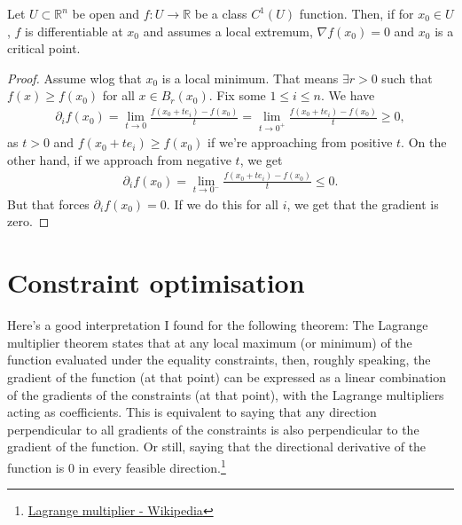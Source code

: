\begin{prop}\label{prop:grad-vanish}
	Let $U \subset \mathbb{R}^{n}$ be open and $f: U \to \mathbb{R}$ be a class $C^{1}(U)$ function. Then, if for $x_{0} \in U$, $f$ is differentiable at $x_{0}$ and assumes a local extremum, $\nabla f(x_{0}) = 0$ and $x_{0}$ is a critical point.
\end{prop}
\begin{proof}
	Assume wlog that $x_{0}$ is a local minimum. That means $\exists r > 0$ such that $f(x) \geq f (x_{0})$ for all $x \in B_{r}(x_{0})$. Fix some $1 \leq i \leq n$. We have
	\begin{align*}
		\partial_{i}f(x_{0}) = \lim_{t \to 0} \frac{f(x_{0} + te_{i}) -f(x_{0})}{t} = \lim_{t \to 0^{+}} \frac{f(x_{0} + te_{i}) -f(x_{0})}{t} \geq 0,
	\end{align*}
	as $t > 0$ and $f(x_{0} + te_{i}) \geq f(x_{0})$ if we're approaching from positive $t$. On the other hand, if we approach from negative $t$, we get
	\begin{align*}
		\partial_{i}f(x_{0}) = \lim_{t \to 0^{-}} \frac{f(x_{0} + te_{i}) - f(x_{0})}{t} \leq 0.
	\end{align*}
	But that forces $\partial_{i} f(x_{0}) = 0$. If we do this for all $i$, we get that the gradient is zero.
\end{proof}

\section{Constraint optimisation}

Here's a good interpretation I found for the following theorem: The Lagrange multiplier theorem states that at any local maximum (or minimum) of the function evaluated under the equality constraints, then, roughly speaking, the gradient of the function (at that point) can be expressed as a linear combination of the gradients of the constraints (at that point), with the Lagrange multipliers acting as coefficients. This is equivalent to saying that any direction perpendicular to all gradients of the constraints is also perpendicular to the gradient of the function. Or still, saying that the directional derivative of the function is 0 in every feasible direction.\footnote{\href{https://en.wikipedia.org/wiki/Lagrange_multiplier}{Lagrange multiplier - Wikipedia}}

